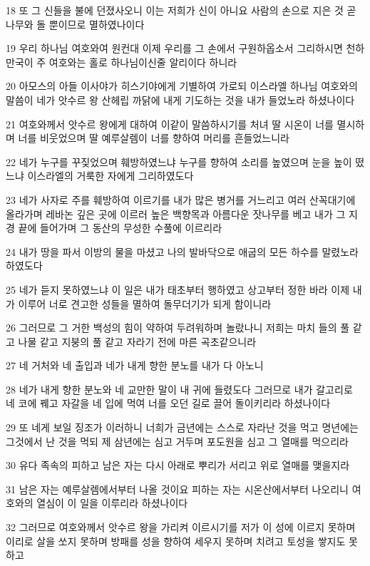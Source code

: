 \par 18 또 그 신들을 불에 던졌사오니 이는 저희가 신이 아니요 사람의 손으로 지은 것 곧 나무와 돌 뿐이므로 멸하였나이다
\par 19 우리 하나님 여호와여 원컨대 이제 우리를 그 손에서 구원하옵소서 그리하시면 천하 만국이 주 여호와는 홀로 하나님이신줄 알리이다 하니라
\par 20 아모스의 아들 이사야가 히스기야에게 기별하여 가로되 이스라엘 하나님 여호와의 말씀이 네가 앗수르 왕 산헤립 까닭에 내게 기도하는 것을 내가 들었노라 하셨나이다
\par 21 여호와께서 앗수르 왕에게 대하여 이같이 말씀하시기를 처녀 딸 시온이 너를 멸시하며 너를 비웃었으며 딸 예루살렘이 너를 향하여 머리를 흔들었느니라
\par 22 네가 누구를 꾸짖었으며 훼방하였느냐 누구를 향하여 소리를 높였으며 눈을 높이 떴느냐 이스라엘의 거룩한 자에게 그리하였도다
\par 23 네가 사자로 주를 훼방하여 이르기를 내가 많은 병거를 거느리고 여러 산꼭대기에 올라가며 레바논 깊은 곳에 이르러 높은 백향목과 아름다운 잣나무를 베고 내가 그 지경 끝에 들어가며 그 동산의 무성한 수풀에 이르리라
\par 24 내가 땅을 파서 이방의 물을 마셨고 나의 발바닥으로 애굽의 모든 하수를 말렸노라 하였도다
\par 25 네가 듣지 못하였느냐 이 일은 내가 태초부터 행하였고 상고부터 정한 바라 이제 내가 이루어 너로 견고한 성들을 멸하여 돌무더기가 되게 함이니라
\par 26 그러므로 그 거한 백성의 힘이 약하여 두려워하며 놀랐나니 저희는 마치 들의 풀 같고 나물 같고 지붕의 풀 같고 자라기 전에 마른 곡초같으니라
\par 27 네 거처와 네 출입과 네가 내게 향한 분노를 내가 다 아노니
\par 28 네가 내게 향한 분노와 네 교만한 말이 내 귀에 들렸도다 그러므로 내가 갈고리로 네 코에 꿰고 자갈을 네 입에 먹여 너를 오던 길로 끌어 돌이키리라 하셨나이다
\par 29 또 네게 보일 징조가 이러하니 너희가 금년에는 스스로 자라난 것을 먹고 명년에는 그것에서 난 것을 먹되 제 삼년에는 심고 거두며 포도원을 심고 그 열매를 먹으리라
\par 30 유다 족속의 피하고 남은 자는 다시 아래로 뿌리가 서리고 위로 열매를 맺을지라
\par 31 남은 자는 예루살렘에서부터 나올 것이요 피하는 자는 시온산에서부터 나오리니 여호와의 열심이 이 일을 이루리라 하셨나이다
\par 32 그러므로 여호와께서 앗수르 왕을 가리켜 이르시기를 저가 이 성에 이르지 못하며 이리로 살을 쏘지 못하며 방패를 성을 향하여 세우지 못하며 치려고 토성을 쌓지도 못하고
